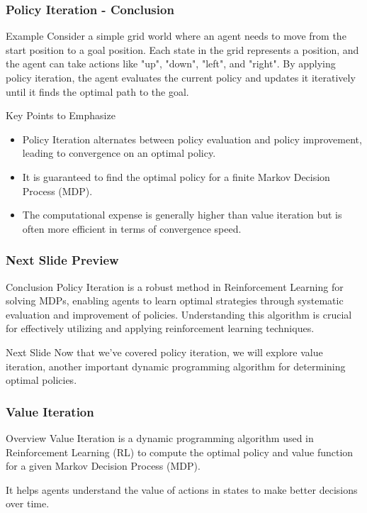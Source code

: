 \documentclass[aspectratio=169]{beamer}
\begin{document}
\begin{frame}[fragile]
    \frametitle{Policy Iteration - Conclusion}
    \begin{block}{Example}
        Consider a simple grid world where an agent needs to move from the start position to a goal position. Each state in the grid represents a position, and the agent can take actions like "up", "down", "left", and "right". By applying policy iteration, the agent evaluates the current policy and updates it iteratively until it finds the optimal path to the goal.
    \end{block}
    
    \begin{block}{Key Points to Emphasize}
        \begin{itemize}
            \item Policy Iteration alternates between policy evaluation and policy improvement, leading to convergence on an optimal policy.
            \item It is guaranteed to find the optimal policy for a finite Markov Decision Process (MDP).
            \item The computational expense is generally higher than value iteration but is often more efficient in terms of convergence speed.
        \end{itemize}
    \end{block}
\end{frame}

\begin{frame}[fragile]
    \frametitle{Next Slide Preview}
    \begin{block}{Conclusion}
        Policy Iteration is a robust method in Reinforcement Learning for solving MDPs, enabling agents to learn optimal strategies through systematic evaluation and improvement of policies. Understanding this algorithm is crucial for effectively utilizing and applying reinforcement learning techniques.
    \end{block}
    
    \begin{block}{Next Slide}
        Now that we've covered policy iteration, we will explore value iteration, another important dynamic programming algorithm for determining optimal policies.
    \end{block}
\end{frame}

\begin{frame}
    \frametitle{Value Iteration}
    \begin{block}{Overview}
        Value Iteration is a dynamic programming algorithm used in Reinforcement Learning (RL) to compute the optimal policy and value function for a given Markov Decision Process (MDP).
    \end{block}
    It helps agents understand the value of actions in states to make better decisions over time.
\end{frame}
\end{document}
